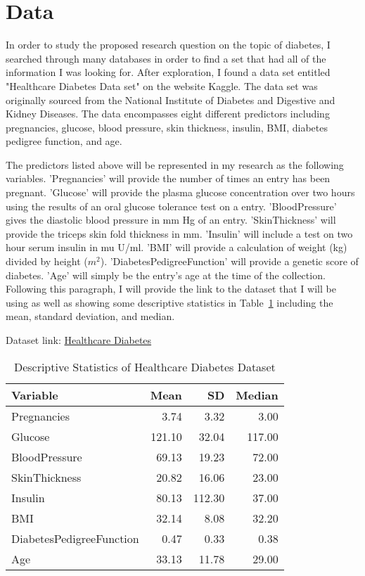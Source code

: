 \documentclass[12pt]{article}
\begin{document}
\section{Data}
\label{sec:data}
    In order to study the proposed research question on the topic of diabetes, I searched through many databases in order to find a set that had all of the information I was looking for. After exploration, I found a data set entitled "Healthcare Diabetes Data set" on the website Kaggle. The data set was originally sourced from the National Institute of Diabetes and Digestive and Kidney Diseases. The data encompasses eight different predictors including pregnancies, glucose, blood pressure, skin thickness, insulin, BMI, diabetes pedigree function, and age.

    The predictors listed above will be represented in my research as the following variables. 'Pregnancies' will provide the number of times an entry has been pregnant. 'Glucose' will provide the plasma glucose concentration over two hours using the results of an oral glucose tolerance test on a entry. 'BloodPressure' gives the diastolic blood pressure in mm Hg of an entry. 'SkinThickness' will provide the triceps skin fold thickness in mm. 'Insulin' will include a test on two hour serum insulin in mu U/ml. 'BMI' will provide a calculation of weight (kg) divided by height ($m^2$). 'DiabetesPedigreeFunction' will provide a genetic score of diabetes. 'Age' will simply be the entry's age at the time of the collection. Following this paragraph, I will provide the link to the dataset that I will be using as well as showing some descriptive statistics in Table~\ref{tab:ds} including the mean, standard deviation, and median.  

Dataset link: \href{https://www.kaggle.com/datasets/nanditapore/healthcare-diabetes}{Healthcare Diabetes}

\begin{table}[ht]
    \caption{Descriptive Statistics of Healthcare Diabetes Dataset}
  \label{tab:ds}
\centering
\begin{tabular}{lrrr}
      \hline
    Variable & Mean & SD & Median \\ 
      \hline
      Pregnancies & 3.74 & 3.32 & 3.00 \\ 
      Glucose & 121.10 & 32.04 & 117.00 \\ 
      BloodPressure & 69.13 & 19.23 & 72.00 \\ 
      SkinThickness & 20.82 & 16.06 & 23.00 \\ 
      Insulin & 80.13 & 112.30 & 37.00 \\ 
      BMI & 32.14 & 8.08 & 32.20 \\ 
      DiabetesPedigreeFunction & 0.47 & 0.33 & 0.38 \\ 
      Age & 33.13 & 11.78 & 29.00 \\ 
       \hline
    \end{tabular}
    \end{table}
\end{document}
